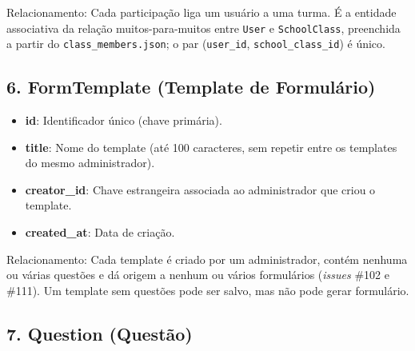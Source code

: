 \documentclass[a4paper,12pt]{article}
\begin{document}
Relacionamento: Cada participação liga um usuário a uma turma. É a entidade associativa da relação muitos-para-muitos entre \texttt{User} e \texttt{SchoolClass}, preenchida a partir do \texttt{class\_members.json}; o par (\texttt{user\_id}, \texttt{school\_class\_id}) é único.

\subsection*{6. FormTemplate (Template de Formulário)}

\begin{itemize}

    \item \textbf{id}: Identificador único (chave primária).

    \item \textbf{title}: Nome do template (até 100 caracteres, sem repetir entre os templates do mesmo administrador).

    \item \textbf{creator\_id}: Chave estrangeira associada ao administrador que criou o template.

    \item \textbf{created\_at}: Data de criação.

\end{itemize}

Relacionamento: Cada template é criado por um administrador, contém nenhuma ou várias questões e dá origem a nenhum ou vários formulários (\textit{issues} \#102 e \#111). Um template sem questões pode ser salvo, mas não pode gerar formulário.

\subsection*{7. Question (Questão)}
\end{document}
